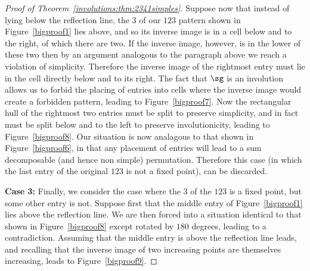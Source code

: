 \documentclass[12pt,twoside]{memoir}
\begin{document}
\begin{proof}[Proof of Theorem~\ref{involutions:thm:2341simples}]
          Suppose now that instead of lying below the reflection line, the $3$ of
          our $123$ pattern shown in Figure~\ref{bigproof1} lies above, and so its
          inverse image is in a cell below and to the right, of which there are
          two. If the inverse image, however, is in the lower of these two then
          by an argument analogous to the paragraph above we reach a violation of
          simplicity. Therefore the inverse image of the rightmost entry must lie
          in the cell directly below and to its right. The fact that $\sg$ is an
          involution allows us to forbid the placing of entries into cells where
          the inverse image would create a forbidden pattern, leading to
          Figure~\ref{bigproof7}. Now the rectangular hull of the rightmost two
          entries must be split to preserve simplicity, and in fact must be split
          below and to the left to preserve involutionicity, leading to
          Figure~\ref{bigproof8}. Our situation is now analagous to that shown in
          Figure~\ref{bigproof6}, in that any placement of entries will lead to a
          sum decomposable (and hence non simple) permutation. Therefore this
          case (in which the last entry of the original $123$ is not a fixed
          point), can be discarded. 

          \textbf{Case 3:}
          Finally, we consider the case where the $3$ of the $123$ is a fixed
          point, but some other entry is not. Suppose first that the middle entry
          of Figure~\ref{bigproof1} lies above the reflection line. We are then
          forced into a situation identical to that shown in
          Figure~\ref{bigproof8} except rotated by $180$ degrees, leading to a
          contradiction. Assuming that the middle entry is above the reflection
          line leads, and recalling that the inverse image of two increasing
          points are themselves increasing, leads to Figure~\ref{bigproof9}. 


\end{proof}
\end{document}
